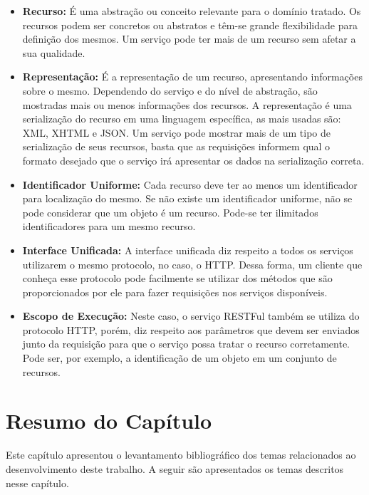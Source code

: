 \begin{itemize}
	\item \textbf{Recurso:} É uma abstração ou conceito relevante para o domínio tratado. Os recursos podem ser concretos ou abstratos e têm-se grande flexibilidade para definição dos mesmos. Um serviço pode ter mais de um recurso sem afetar a sua qualidade.
	\item \textbf{Representação:} É a representação de um recurso, apresentando informações sobre o mesmo. Dependendo do serviço e do nível de abstração, são mostradas mais ou menos informações dos recursos. A representação é uma serialização do recurso em uma linguagem específica, as mais usadas são: XML, XHTML e JSON. Um serviço pode mostrar mais de um tipo de serialização de seus recursos, basta que as requisições informem qual o formato desejado que o serviço irá apresentar os dados na serialização correta.
	\item \textbf{Identificador Uniforme:} Cada recurso deve ter ao menos um identificador para localização do mesmo. Se não existe um identificador uniforme, não se pode considerar que um objeto é um recurso. Pode-se ter ilimitados identificadores para um mesmo recurso.
	\item \textbf{Interface Unificada:} A interface unificada diz respeito a todos os serviços utilizarem o mesmo protocolo, no caso, o HTTP. Dessa forma, um cliente que conheça esse protocolo pode facilmente se utilizar dos métodos que são proporcionados por ele para fazer requisições nos serviços disponíveis.
	\item \textbf{Escopo de Execução:} Neste caso, o serviço RESTFul também se utiliza do protocolo HTTP, porém, diz respeito aos parâmetros que devem ser enviados junto da requisição para que o serviço possa tratar o recurso corretamente. Pode ser, por exemplo, a identificação de um objeto em um conjunto de recursos.
\end{itemize}

\section{Resumo do Capítulo}
Este capítulo apresentou o levantamento bibliográfico dos temas relacionados ao desenvolvimento deste trabalho. A seguir são apresentados os temas descritos nesse capítulo.

